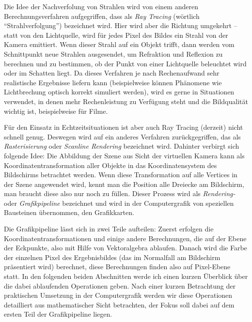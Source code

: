 Die Idee der Nachverfolung von Strahlen wird von einem anderen Berechnungsverfahren aufgegriffen, dass als \emph{Ray Tracing} (wörtlich \enquote{Strahlverfolgung}) bezeichnet wird. Hier wird aber die Richtung umgekehrt -- statt von den Lichtquelle, wird für jedes Pixel des Bildes ein Strahl von der Kamera emittiert. Wenn dieser Strahl auf ein Objekt trifft, dann werden vom Schnittpunkt neue Strahlen ausgesendet, um Refraktion und Reflexion zu berechnen und zu bestimmen, ob der Punkt von einer Lichtquelle beleuchtet wird oder im Schatten liegt. Da dieses Verfahren je nach Rechenaufwand sehr realistische Ergebnisse liefern kann (beispielweise können Phänomene wie Lichtbrechung optisch korrekt simuliert werden), wird es gerne in Situationen verwendet, in denen mehr Rechenleistung zu Verfügung steht und die Bildqualität wichtig ist, beispielweise für Filme.

Für den Einsatz in Echtzeitsituationen ist aber auch Ray Tracing (derzeit) nicht schnell genug. Deswegen wird auf ein anderes Verfahren zurückgegriffen, das als \emph{Rasterisierung} oder \emph{Scanline Rendering} bezeichnet wird. Dahinter verbirgt sich folgende Idee: Die Abbildung der Szene aus Sicht der virtuellen Kamera kann als Koordinatentransformation aller Objekte in das Koordinatensystem des Bildschirms betrachtet werden. Wenn diese Transformation auf alle Vertices in der Szene angewendet wird, kennt man die Position alle Dreiecke am Bildschirm, man braucht diese also nur noch zu füllen. Dieser Prozess wird als \emph{Rendering-} oder \emph{Grafikpipeline} bezeichnet und wird in der Computergrafik von speziellen Bausteinen übernommen, den Grafikkarten.

Die Grafikpipeline lässt sich in zwei Teile aufteilen: Zuerst erfolgen die Koordinatentransformationen und einige andere Berechnungen, die auf der Ebene der Eckpunkte, also mit Hilfe von Vektoralgebra ablaufen. Danach wird die Farbe der einzelnen Pixel des Ergebnisbildes (das im Normalfall am Bildschirm präsentiert wird) berechnet, diese Berechnungen finden also auf Pixel-Ebene statt. In den folgenden beiden Abschnitten werde ich einen kurzen Überblick über die dabei ablaufenden Operationen geben. Nach einer kurzen Betrachtung der praktischen Umsetzung in der Computergrafik werden wir diese Operationen detailliert aus mathematischer Sicht betrachten, der Fokus soll dabei auf dem ersten Teil der Grafikpipeline liegen.



